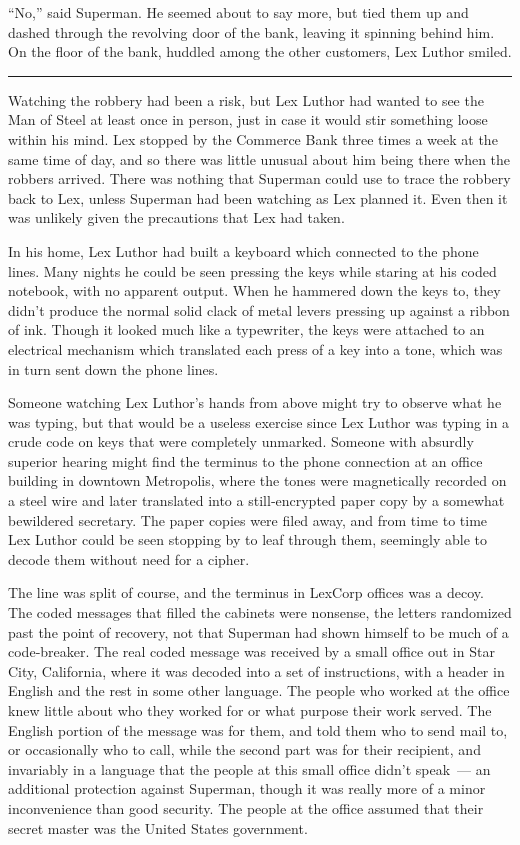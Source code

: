 \documentclass[ebook,12pt]{memoir}
\begin{document}
``No,'' said Superman. He seemed about to say more, but tied them up and
dashed through the revolving door of the bank, leaving it spinning
behind him. On the floor of the bank, huddled among the other customers,
Lex Luthor smiled.

\begin{center}\rule{0.5\linewidth}{0.5pt}\end{center}

Watching the robbery had been a risk, but Lex Luthor had wanted to see
the Man of Steel at least once in person, just in case it would stir
something loose within his mind. Lex stopped by the Commerce Bank three
times a week at the same time of day, and so there was little unusual
about him being there when the robbers arrived. There was nothing that
Superman could use to trace the robbery back to Lex, unless Superman had
been watching as Lex planned it. Even then it was unlikely given the
precautions that Lex had taken.

In his home, Lex Luthor had built a keyboard which connected to the
phone lines. Many nights he could be seen pressing the keys while
staring at his coded notebook, with no apparent output. When he hammered
down the keys to, they didn't produce the normal solid clack of metal
levers pressing up against a ribbon of ink. Though it looked much like a
typewriter, the keys were attached to an electrical mechanism which
translated each press of a key into a tone, which was in turn sent down
the phone lines.

Someone watching Lex Luthor's hands from above might try to observe what
he was typing, but that would be a useless exercise since Lex Luthor was
typing in a crude code on keys that were completely unmarked. Someone
with absurdly superior hearing might find the terminus to the phone
connection at an office building in downtown Metropolis, where the tones
were magnetically recorded on a steel wire and later translated into a
still‐encrypted paper copy by a somewhat bewildered secretary. The paper
copies were filed away, and from time to time Lex Luthor could be seen
stopping by to leaf through them, seemingly able to decode them without
need for a cipher.

The line was split of course, and the terminus in LexCorp offices was a
decoy. The coded messages that filled the cabinets were nonsense, the
letters randomized past the point of recovery, not that Superman had
shown himself to be much of a code‐breaker. The real coded message was
received by a small office out in Star City, California, where it was
decoded into a set of instructions, with a header in English and the
rest in some other language. The people who worked at the office knew
little about who they worked for or what purpose their work served. The
English portion of the message was for them, and told them who to send
mail to, or occasionally who to call, while the second part was for
their recipient, and invariably in a language that the people at this
small office didn't speak~--- an additional protection against Superman,
though it was really more of a minor inconvenience than good security.
The people at the office assumed that their secret master was the United
States government.
\end{document}
